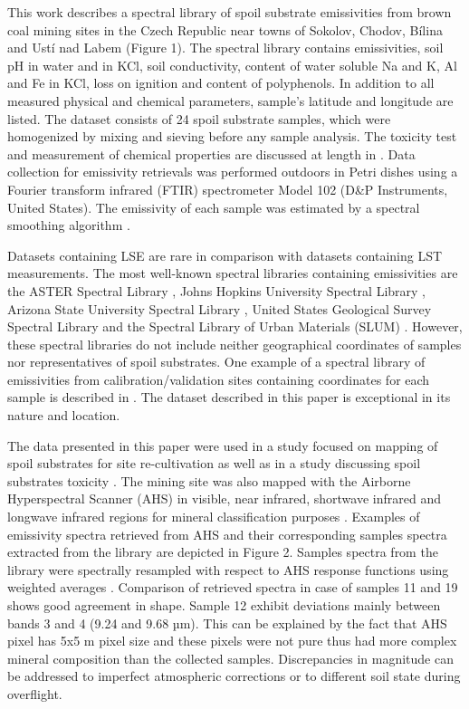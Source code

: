 This work describes a spectral library of spoil substrate emissivities from brown coal mining sites in the Czech Republic near towns of Sokolov, Chodov, Bílina and Ustí nad Labem (Figure 1). The spectral library contains emissivities, soil pH in water and in KCl, soil conductivity, content of water soluble Na and K, Al and Fe in KCl, loss on ignition and content of polyphenols. In addition to all measured physical and chemical parameters, sample’s latitude and longitude are listed. The dataset consists of 24 spoil substrate samples, which were homogenized by mixing and sieving before any sample analysis. The toxicity test and measurement of chemical properties are discussed at length in \cite{FK05}. Data collection for emissivity retrievals was performed outdoors in Petri dishes using a Fourier transform infrared (FTIR) spectrometer Model 102 (D\&P Instruments, United States). The emissivity of each sample was estimated by a spectral smoothing algorithm \cite{HJ98}.

Datasets containing LSE are rare in comparison with datasets containing LST measurements. The most well-known spectral libraries containing emissivities are the ASTER Spectral Library \cite{BH09}, Johns Hopkins University Spectral Library \cite{SW91}, Arizona State University Spectral Library \cite{CB00}, United States Geological Survey Spectral Library \cite{CS16} and the Spectral Library of Urban Materials (SLUM) \cite{KS14}. However, these spectral libraries do not include neither geographical coordinates of samples nor representatives of spoil substrates. One example of a spectral library of emissivities from calibration/validation sites containing coordinates for each sample is described in \cite{SM09}. The dataset described in this paper is exceptional in its nature and location. 

The data presented in this paper were used in a study focused on mapping of spoil substrates for site re-cultivation \cite{Z14} as well as in a study discussing spoil substrates toxicity \cite{FK05}. The mining site was also mapped with the Airborne Hyperspectral Scanner (AHS) in visible, near infrared, shortwave infrared and longwave infrared regions for mineral classification purposes \cite{NK14}. Examples of emissivity spectra retrieved from AHS and their corresponding samples spectra extracted from the library are depicted in Figure 2. Samples spectra from the library were spectrally resampled with respect to AHS response functions using weighted averages \cite{LT13}. Comparison of retrieved spectra in case of samples 11 and 19 shows good agreement in shape. Sample 12 exhibit deviations mainly between bands 3 and 4 (9.24 and 9.68 µm). This can be explained by the fact that AHS pixel has 5x5 m pixel size and these pixels were not pure thus had more complex mineral composition than the collected samples. Discrepancies in magnitude can be addressed to imperfect atmospheric corrections or to different soil state during overflight.

